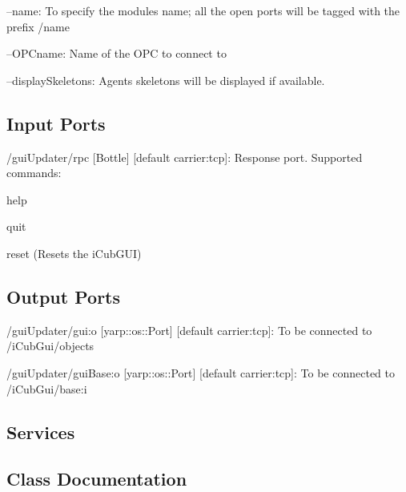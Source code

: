 \begin{DoxyItemize}
\item --name\+: To specify the module\textquotesingle{}s name; all the open ports will be tagged with the prefix /name
\item --O\+P\+Cname\+: Name of the O\+PC to connect to
\item --display\+Skeletons\+: Agents skeletons will be displayed if available. 
\end{DoxyItemize}\hypertarget{group__touchDetector_inputports_sec}{}\subsection{Input Ports}\label{group__touchDetector_inputports_sec}

\begin{DoxyItemize}
\item /gui\+Updater/rpc \mbox{[}Bottle\mbox{]} \mbox{[}default carrier\+:tcp\mbox{]}\+: Response port. Supported commands\+:
\begin{DoxyItemize}
\item help
\item quit
\item reset (Resets the i\+Cub\+G\+UI)
\end{DoxyItemize}
\end{DoxyItemize}\hypertarget{group__touchDetector_outputports_sec}{}\subsection{Output Ports}\label{group__touchDetector_outputports_sec}

\begin{DoxyItemize}
\item /gui\+Updater/gui\+:o \mbox{[}yarp\+::os\+::\+Port\mbox{]} \mbox{[}default carrier\+:tcp\mbox{]}\+: To be connected to /i\+Cub\+Gui/objects
\item /gui\+Updater/gui\+Base\+:o \mbox{[}yarp\+::os\+::\+Port\mbox{]} \mbox{[}default carrier\+:tcp\mbox{]}\+: To be connected to /i\+Cub\+Gui/base\+:i
\end{DoxyItemize}\hypertarget{group__touchDetector_services_sec}{}\subsection{Services}\label{group__touchDetector_services_sec}


\subsection{Class Documentation}
\label{classGuiUpdater}
